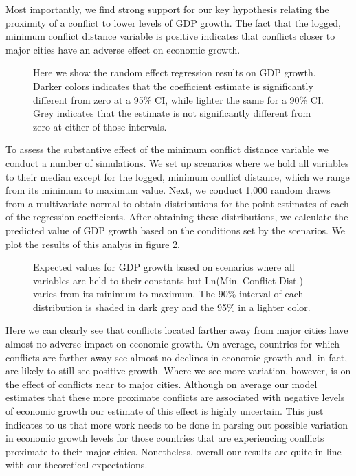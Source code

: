 Most importantly, we find strong support for our key hypothesis relating the proximity of a conflict to lower levels of GDP growth. The fact that the logged, minimum conflict distance variable is positive indicates that conflicts closer to major cities have an adverse effect on economic growth. 

\begin{figure}[ht]
	\centering
	\resizebox{.6\textwidth}{!}{}
	\caption{Here we show the random effect regression results on GDP growth. Darker colors indicates that the coefficient estimate is significantly different from zero at a 95\% CI, while lighter the same for a 90\% CI. Grey indicates that the estimate is not significantly different from zero at either of those intervals.}
	\label{fig:coefPlot}	
\end{figure}
\FloatBarrier

To assess the substantive effect of the minimum conflict distance variable we conduct a number of simulations. We set up scenarios where we hold all variables to their median except for the logged, minimum conflict distance, which we range from its minimum to maximum value. Next, we conduct 1,000 random draws from a multivariate normal to obtain distributions for the point estimates of each of the regression coefficients. After obtaining these distributions, we calculate the predicted value of GDP growth based on the conditions set by the scenarios. We plot the results of this analyis in figure \ref{fig:simsPlot}.  

\begin{figure}[ht]
	\centering
	\resizebox{.8\textwidth}{!}{}
	\caption{Expected values for GDP growth based on scenarios where all variables are held to their constants but Ln(Min. Conflict Dist.) varies from its minimum to maximum. The 90\% interval of each distribution is shaded in dark grey and the 95\% in a lighter color.}
	\label{fig:simsPlot}
\end{figure}
\FloatBarrier

Here we can clearly see that conflicts located farther away from major cities have almost no adverse impact on economic growth. On average, countries for which conflicts are farther away see almost no declines in economic growth and, in fact, are likely to still see positive growth. Where we see more variation, however, is on the effect of conflicts near to major cities. Although on average our model estimates that these more proximate conflicts are associated with negative levels of economic growth our estimate of this effect is highly uncertain. This just indicates to us that more work needs to be done in parsing out possible variation in economic growth levels for those countries that are experiencing conflicts proximate to their major cities. Nonetheless, overall our results are quite in line with our theoretical expectations.